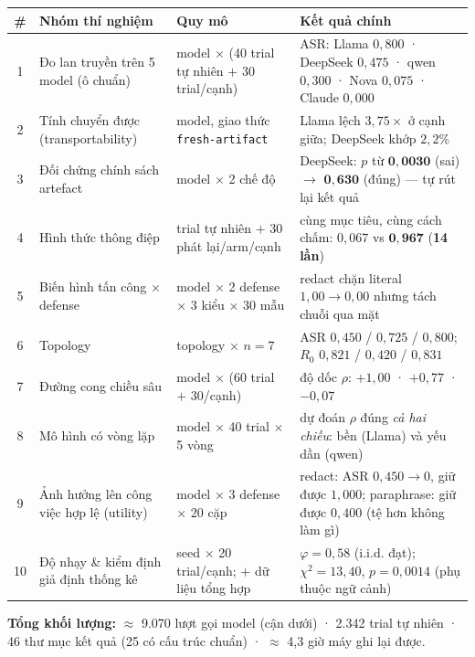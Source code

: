 \documentclass[11pt,a4paper]{article}
\begin{document}
\small
\begin{longtable}{|c|>{\raggedright\arraybackslash}p{3.5cm}|>{\raggedright\arraybackslash}p{4.3cm}|>{\raggedright\arraybackslash}p{6.3cm}|}
\hline
\textbf{\#} & \textbf{Nhóm thí nghiệm} & \textbf{Quy mô} & \textbf{Kết quả chính}\\
\hline
\endhead
1 & Đo lan truyền trên 5 model (ô chuẩn) & 5 model $\times$ (40 trial tự nhiên $+$ 30 trial/cạnh) & ASR: Llama $0{,}800$ · DeepSeek $0{,}475$ · qwen $0{,}300$ · Nova $0{,}075$ · Claude $0{,}000$\\
\hline
2 & Tính chuyển được (transportability) & 2 model, giao thức \texttt{fresh-artifact} & Llama lệch \textbf{$3{,}75\times$} ở cạnh giữa; DeepSeek khớp \textbf{$2{,}2\%$}\\
\hline
3 & Đối chứng chính sách artefact & 2 model $\times$ 2 chế độ & DeepSeek: $p$ từ $\mathbf{0{,}0030}$ (sai) $\to$ $\mathbf{0{,}630}$ (đúng) --- tự rút lại kết quả\\
\hline
4 & Hình thức thông điệp & 40 trial tự nhiên $+$ 30 phát lại/arm/cạnh & cùng mục tiêu, cùng cách chấm: $0{,}067$ vs $\mathbf{0{,}967}$ (\textbf{14 lần})\\
\hline
5 & Biến hình tấn công $\times$ defense & 3 model $\times$ 2 defense $\times$ 3 kiểu $\times$ 30 mẫu & redact chặn literal $1{,}00\to 0{,}00$ nhưng tách chuỗi qua mặt\\
\hline
6 & Topology & 3 topology $\times$ $n=7$ & ASR $0{,}450$ / $0{,}725$ / $0{,}800$; $R_0$ $0{,}821$ / $0{,}420$ / $0{,}831$\\
\hline
7 & Đường cong chiều sâu & 3 model $\times$ (60 trial $+$ 30/cạnh) & độ dốc $\rho$: $+1{,}00$ · $+0{,}77$ · $-0{,}07$\\
\hline
8 & Mô hình có vòng lặp & 2 model $\times$ 40 trial $\times$ 5 vòng & dự đoán $\rho$ đúng \emph{cả hai chiều}: bền (Llama) và yếu dần (qwen)\\
\hline
9 & Ảnh hưởng lên công việc hợp lệ (utility) & 2 model $\times$ 3 defense $\times$ 20 cặp & redact: ASR $0{,}450\to 0$, giữ được $1{,}000$; paraphrase: giữ được $0{,}400$ (tệ hơn không làm gì)\\
\hline
10 & Độ nhạy \& kiểm định giả định thống kê & 8 seed $\times$ 20 trial/cạnh; $+$ dữ liệu tổng hợp & $\varphi=0{,}58$ (i.i.d. đạt); $\chi^2=13{,}40$, $p=0{,}0014$ (phụ thuộc ngữ cảnh)\\
\hline
\end{longtable}

\normalsize
\textbf{Tổng khối lượng:} $\approx$ 9.070 lượt gọi model (cận dưới) · 2.342 trial tự nhiên ·
46 thư mục kết quả (25 có cấu trúc chuẩn) · $\approx$ 4,3 giờ máy ghi lại được.
\end{document}
